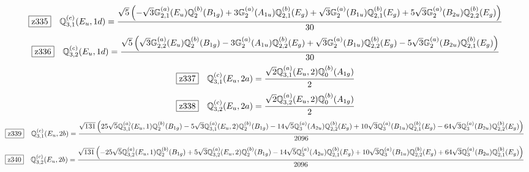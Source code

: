 \documentclass[fleqn,10pt,landscape]{jsarticle}
\begin{document}
\begin{dmath*}
\hspace*{3mm}\fbox{z335}\quad \mathbb{Q}_{3,1}^{(c)}(E_{u},1d)=\frac{\sqrt{5} \left(- \sqrt{3} \mathbb{G}_{2,1}^{(a)}(E_{u}) \mathbb{Q}_{2}^{(b)}(B_{1g}) + 3 \mathbb{G}_{2}^{(a)}(A_{1u}) \mathbb{Q}_{2,1}^{(b)}(E_{g}) + \sqrt{3} \mathbb{G}_{2}^{(a)}(B_{1u}) \mathbb{Q}_{2,1}^{(b)}(E_{g}) + 5 \sqrt{3} \mathbb{G}_{2}^{(a)}(B_{2u}) \mathbb{Q}_{2,2}^{(b)}(E_{g})\right)}{30}
\end{dmath*}
\begin{dmath*}
\hspace*{3mm}\fbox{z336}\quad \mathbb{Q}_{3,2}^{(c)}(E_{u},1d)=\frac{\sqrt{5} \left(\sqrt{3} \mathbb{G}_{2,2}^{(a)}(E_{u}) \mathbb{Q}_{2}^{(b)}(B_{1g}) - 3 \mathbb{G}_{2}^{(a)}(A_{1u}) \mathbb{Q}_{2,2}^{(b)}(E_{g}) + \sqrt{3} \mathbb{G}_{2}^{(a)}(B_{1u}) \mathbb{Q}_{2,2}^{(b)}(E_{g}) - 5 \sqrt{3} \mathbb{G}_{2}^{(a)}(B_{2u}) \mathbb{Q}_{2,1}^{(b)}(E_{g})\right)}{30}
\end{dmath*}
\begin{dmath*}
\hspace*{3mm}\fbox{z337}\quad \mathbb{Q}_{3,1}^{(c)}(E_{u},2a)=\frac{\sqrt{2} \mathbb{Q}_{3,1}^{(a)}(E_{u},2) \mathbb{Q}_{0}^{(b)}(A_{1g})}{2}
\end{dmath*}
\begin{dmath*}
\hspace*{3mm}\fbox{z338}\quad \mathbb{Q}_{3,2}^{(c)}(E_{u},2a)=\frac{\sqrt{2} \mathbb{Q}_{3,2}^{(a)}(E_{u},2) \mathbb{Q}_{0}^{(b)}(A_{1g})}{2}
\end{dmath*}
\begin{dmath*}
\hspace*{3mm}\fbox{z339}\quad \mathbb{Q}_{3,1}^{(c)}(E_{u},2b)=\frac{\sqrt{131} \left(25 \sqrt{5} \mathbb{Q}_{3,1}^{(a)}(E_{u},1) \mathbb{Q}_{2}^{(b)}(B_{1g}) - 5 \sqrt{3} \mathbb{Q}_{3,1}^{(a)}(E_{u},2) \mathbb{Q}_{2}^{(b)}(B_{1g}) - 14 \sqrt{5} \mathbb{Q}_{3}^{(a)}(A_{2u}) \mathbb{Q}_{2,2}^{(b)}(E_{g}) + 10 \sqrt{3} \mathbb{Q}_{3}^{(a)}(B_{1u}) \mathbb{Q}_{2,1}^{(b)}(E_{g}) - 64 \sqrt{3} \mathbb{Q}_{3}^{(a)}(B_{2u}) \mathbb{Q}_{2,2}^{(b)}(E_{g})\right)}{2096}
\end{dmath*}
\begin{dmath*}
\hspace*{3mm}\fbox{z340}\quad \mathbb{Q}_{3,2}^{(c)}(E_{u},2b)=\frac{\sqrt{131} \left(- 25 \sqrt{5} \mathbb{Q}_{3,2}^{(a)}(E_{u},1) \mathbb{Q}_{2}^{(b)}(B_{1g}) + 5 \sqrt{3} \mathbb{Q}_{3,2}^{(a)}(E_{u},2) \mathbb{Q}_{2}^{(b)}(B_{1g}) - 14 \sqrt{5} \mathbb{Q}_{3}^{(a)}(A_{2u}) \mathbb{Q}_{2,1}^{(b)}(E_{g}) + 10 \sqrt{3} \mathbb{Q}_{3}^{(a)}(B_{1u}) \mathbb{Q}_{2,2}^{(b)}(E_{g}) + 64 \sqrt{3} \mathbb{Q}_{3}^{(a)}(B_{2u}) \mathbb{Q}_{2,1}^{(b)}(E_{g})\right)}{2096}
\end{dmath*}
\end{document}
